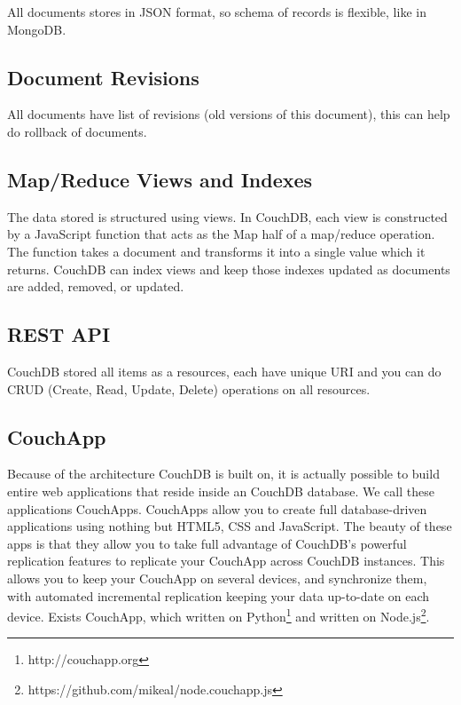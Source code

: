 All documents stores in JSON format, so schema of records is flexible, like in MongoDB.

\subsection{Document Revisions}

All documents have list of revisions (old versions of this document), this can help do rollback of documents.

\subsection{Map/Reduce Views and Indexes}

The data stored is structured using views. In CouchDB, each view is constructed by a JavaScript function that acts as the Map half of a map/reduce operation. The function takes a document and transforms it into a single value which it returns. CouchDB can index views and keep those indexes updated as documents are added, removed, or updated.

\subsection{REST API}

CouchDB stored all items as a resources, each have unique URI and you can do CRUD (Create, Read, Update, Delete) operations on all resources.

\subsection{CouchApp}

Because of the architecture CouchDB is built on, it is actually possible to build entire web applications that reside inside an CouchDB database. We call these applications CouchApps. CouchApps allow you to create full database-driven applications using nothing but HTML5, CSS and JavaScript. The beauty of these apps is that they allow you to take full advantage of CouchDB's powerful replication features to replicate your CouchApp across CouchDB instances. This allows you to keep your CouchApp on several devices, and synchronize them, with automated incremental replication keeping your data up-to-date on each device.\cite{ibm_couchapp} Exists CouchApp, which written on Python\footnote{http://couchapp.org} and written on Node.js\footnote{https://github.com/mikeal/node.couchapp.js}.

